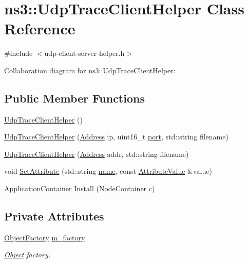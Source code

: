 \hypertarget{classns3_1_1UdpTraceClientHelper}{}\section{ns3\+:\+:Udp\+Trace\+Client\+Helper Class Reference}
\label{classns3_1_1UdpTraceClientHelper}


{\ttfamily \#include $<$udp-\/client-\/server-\/helper.\+h$>$}



Collaboration diagram for ns3\+:\+:Udp\+Trace\+Client\+Helper\+:
\subsection*{Public Member Functions}
\begin{DoxyCompactItemize}
\item 
\hyperlink{classns3_1_1UdpTraceClientHelper_a7098a22832d852a4f614b439be894409}{Udp\+Trace\+Client\+Helper} ()
\item 
\hyperlink{classns3_1_1UdpTraceClientHelper_abb6cba708ba1847e006679f155319650}{Udp\+Trace\+Client\+Helper} (\hyperlink{classns3_1_1Address}{Address} ip, uint16\+\_\+t \hyperlink{visualizer-ideas_8txt_a21ff1c530daf8435e00048b7fc2c58e3}{port}, std\+::string filename)
\item 
\hyperlink{classns3_1_1UdpTraceClientHelper_a7e14c52ec10b11f892a9a3b4d24be598}{Udp\+Trace\+Client\+Helper} (\hyperlink{classns3_1_1Address}{Address} addr, std\+::string filename)
\item 
void \hyperlink{classns3_1_1UdpTraceClientHelper_a738dfc5345069f11cb944aeff10dfbdd}{Set\+Attribute} (std\+::string \hyperlink{generate__test__data__lte__spectrum__model_8m_ab74e6bf80237ddc4109968cedc58c151}{name}, const \hyperlink{classns3_1_1AttributeValue}{Attribute\+Value} \&value)
\item 
\hyperlink{classns3_1_1ApplicationContainer}{Application\+Container} \hyperlink{classns3_1_1UdpTraceClientHelper_a4fcfaf13cf6c34bd5742f3a8d29ab8b7}{Install} (\hyperlink{classns3_1_1NodeContainer}{Node\+Container} \hyperlink{mmwave_2model_2fading-traces_2fading__trace__generator_8m_ae0323a9039add2978bf5b49550572c7c}{c})
\end{DoxyCompactItemize}
\subsection*{Private Attributes}
\begin{DoxyCompactItemize}
\item 
\hyperlink{classns3_1_1ObjectFactory}{Object\+Factory} \hyperlink{classns3_1_1UdpTraceClientHelper_ae1012eb555c375f423a00a3ae0db826b}{m\+\_\+factory}
\begin{DoxyCompactList}\small\item\em \hyperlink{classns3_1_1Object}{Object} factory. \end{DoxyCompactList}\end{DoxyCompactItemize}


